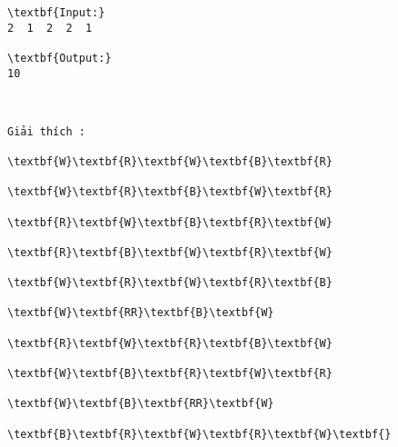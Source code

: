 \begin{verbatim}
\textbf{Input:}
2  1  2  2  1

\textbf{Output:}
10\end{verbatim}
\begin{verbatim}


Giải thích :

\textbf{W}\textbf{R}\textbf{W}\textbf{B}\textbf{R}

\textbf{W}\textbf{R}\textbf{B}\textbf{W}\textbf{R}

\textbf{R}\textbf{W}\textbf{B}\textbf{R}\textbf{W}

\textbf{R}\textbf{B}\textbf{W}\textbf{R}\textbf{W}

\textbf{W}\textbf{R}\textbf{W}\textbf{R}\textbf{B}

\textbf{W}\textbf{RR}\textbf{B}\textbf{W}

\textbf{R}\textbf{W}\textbf{R}\textbf{B}\textbf{W}

\textbf{W}\textbf{B}\textbf{R}\textbf{W}\textbf{R}

\textbf{W}\textbf{B}\textbf{RR}\textbf{W}

\textbf{B}\textbf{R}\textbf{W}\textbf{R}\textbf{W}\textbf{}\end{verbatim}